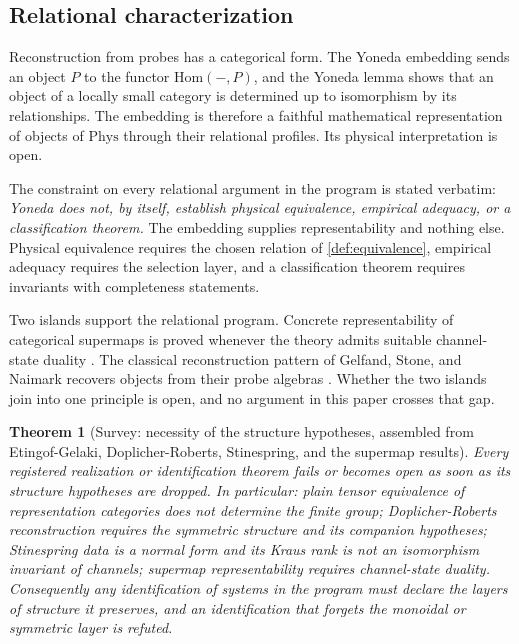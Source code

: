 \documentclass[11pt,letterpaper]{article}
\newtheorem{theorem}{Theorem}[section]
\theoremstyle{definition}
\begin{document}
\subsection{Relational characterization}

Reconstruction from probes has a categorical form. The Yoneda embedding sends an object $P$ to the functor $\mathrm{Hom}(-, P)$, and the Yoneda lemma shows that an object of a locally small category is determined up to isomorphism by its relationships. The embedding is therefore a faithful mathematical representation of objects of $\mathrm{Phys}$ through their relational profiles. Its physical interpretation is open.

The constraint on every relational argument in the program is stated verbatim: \emph{Yoneda does not, by itself, establish physical equivalence, empirical adequacy, or a classification theorem.} The embedding supplies representability and nothing else. Physical equivalence requires the chosen relation of \cref{def:equivalence}, empirical adequacy requires the selection layer, and a classification theorem requires invariants with completeness statements.

Two islands support the relational program. Concrete representability of categorical supermaps is proved whenever the theory admits suitable channel-state duality \cite{corpus-40,corpus-41}. The classical reconstruction pattern of Gelfand, Stone, and Naimark recovers objects from their probe algebras \cite{corpus-42,corpus-44}. Whether the two islands join into one principle is open, and no argument in this paper crosses that gap.

\begin{theorem}[Survey: necessity of the structure hypotheses, assembled from Etingof-Gelaki, Doplicher-Roberts, Stinespring, and the supermap results]
\label{thm:hypotheses}
Every registered realization or identification theorem fails or becomes open as soon as its structure hypotheses are dropped. In particular: plain tensor equivalence of representation categories does not determine the finite group; Doplicher-Roberts reconstruction requires the symmetric structure and its companion hypotheses; Stinespring data is a normal form and its Kraus rank is not an isomorphism invariant of channels; supermap representability requires channel-state duality. Consequently any identification of systems in the program must declare the layers of structure it preserves, and an identification that forgets the monoidal or symmetric layer is refuted.
\end{theorem}
\end{document}
